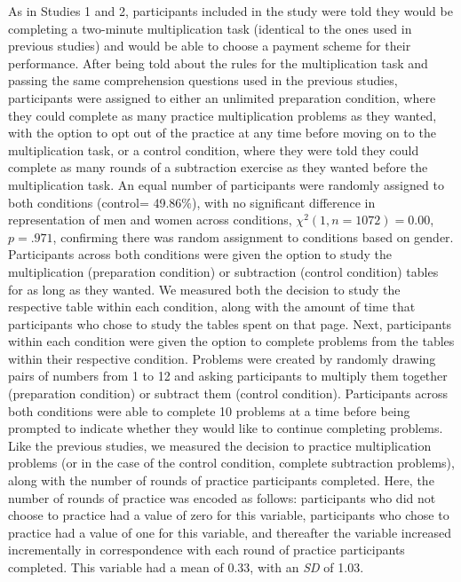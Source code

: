 \documentclass[letterpaper, nobind]{templates/ociamthesis}
\begin{document}
As in Studies 1 and 2, participants included in the study were told they would be completing a two-minute multiplication task (identical to the ones used in previous studies) and would be able to choose a payment scheme for their performance. After being told about the rules for the multiplication task and passing the same comprehension questions used in the previous studies, participants were assigned to either an unlimited preparation condition, where they could complete as many practice multiplication problems as they wanted, with the option to opt out of the practice at any time before moving on to the multiplication task, or a control condition, where they were told they could complete as many rounds of a subtraction exercise as they wanted before the multiplication task. An equal number of participants were randomly assigned to both conditions (control= 49.86\%), with no significant difference in representation of men and women across conditions, \(\chi^2(1, n = 1072) = 0.00\), \(p = .971\), confirming there was random assignment to conditions based on gender. Participants across both conditions were given the option to study the multiplication (preparation condition) or subtraction (control condition) tables for as long as they wanted. We measured both the decision to study the respective table within each condition, along with the amount of time that participants who chose to study the tables spent on that page. Next, participants within each condition were given the option to complete problems from the tables within their respective condition. Problems were created by randomly drawing pairs of numbers from 1 to 12 and asking participants to multiply them together (preparation condition) or subtract them (control condition). Participants across both conditions were able to complete 10 problems at a time before being prompted to indicate whether they would like to continue completing problems. Like the previous studies, we measured the decision to practice multiplication problems (or in the case of the control condition, complete subtraction problems), along with the number of rounds of practice participants completed. Here, the number of rounds of practice was encoded as follows: participants who did not choose to practice had a value of zero for this variable, participants who chose to practice had a value of one for this variable, and thereafter the variable increased incrementally in correspondence with each round of practice participants completed. This variable had a mean of 0.33, with an \emph{SD} of 1.03.
\end{document}
